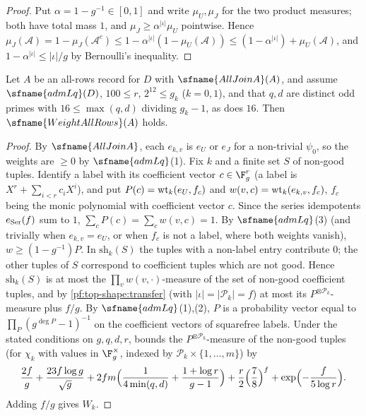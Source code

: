 \begin{proof}
Put $\alpha=1-g^{-1}\in[0,1]$ and write $\mu_U,\mu_J$ for the two product measures; both have total mass $1$, and
$\mu_J\ge\alpha^{|\iota|}\mu_U$ pointwise. Hence
$\mu_J(\mathcal A)=1-\mu_J(\mathcal A^c)\le1-\alpha^{|\iota|}(1-\mu_U(\mathcal A))\le(1-\alpha^{|\iota|})+\mu_U(\mathcal
A)$, and $1-\alpha^{|\iota|}\le|\iota|/g$ by Bernoulli's inequality.
\end{proof}

\begin{lemma}\label{pf:top-shape:weight}
Let $A$ be an all-rows record for $D$ with $\sfname{AllJoinA}(A)$, and assume $\sfname{admLq}(D)$, $100\le r$,
$2^{12}\le g_k$ ($k=0,1$), and that $q,d$ are distinct odd primes with $16\le\max(q,d)$ dividing $g_k-1$, as does
$16$. Then $\sfname{WeightAllRows}(A)$ holds.
\end{lemma}

\begin{proof}
By $\sfname{AllJoinA}$, each $e_{k,v}$ is $e_U$ or $e_J$ for a non-trivial $\psi_0$, so the weights are $\ge0$ by
$\sfname{admLq}$(1). Fix $k$ and a finite set $S$ of non-good tuples. Identify a label with its coefficient vector
$c\in\F_g^r$ (a label is $X^r+\sum_{i<r}c_iX^i$), and put $P(c)=\mathrm{wt}_k(e_U,f_c)$ and
$w(v,c)=\mathrm{wt}_k(e_{k,v},f_c)$, $f_c$ being the monic polynomial with coefficient vector $c$. Since the series
idempotents $e_{\rm Ser}(f)$ sum to $1$, $\sum_cP(c)=\sum_cw(v,c)=1$. By $\sfname{admLq}$(3) (and trivially when
$e_{k,v}=e_U$, or when $f_c$ is not a label, where both weights vanish), $w\ge(1-g^{-1})P$. In $\mathrm{sh}_k(S)$ the
tuples with a non-label entry contribute $0$; the other tuples of $S$ correspond to coefficient tuples which are
not good. Hence $\mathrm{sh}_k(S)$ is at most the $\prod_vw(v,\cdot)$-measure of the set of non-good coefficient
tuples, and by \cref{pf:top-shape:transfer} (with $|\iota|=|\mathcal P_k|=f$) at most its $P^{\otimes\mathcal
P_k}$-measure plus $f/g$. By $\sfname{admLq}$(1),(2), $P$ is a probability vector equal to $\prod_P(g^{\deg P}-1)^{-1}$
on the coefficient vectors of squarefree labels. Under the stated conditions on $g,q,d,r$,
 bounds the
$P^{\otimes\mathcal P_k}$-measure of the non-good tuples (for $\chi_k$ with values in $\F_g^\times$, indexed by
$\mathcal P_k\times\{1,\dots,m\}$) by
\[
\frac{2f}{g}+\frac{23f\log g}{\sqrt g}+2fm\Bigl(\frac1{4\min(q,d)}+\frac{1+\log r}{g-1}\Bigr)+\frac r2\Bigl(\frac78\Bigr)^f
+\exp\Bigl(-\frac f{5\log r}\Bigr).
\]
Adding $f/g$ gives $W_k$.
\end{proof}

